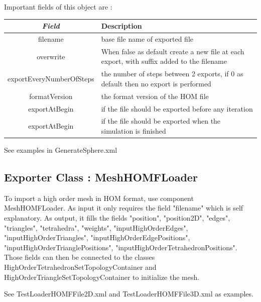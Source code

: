\documentclass[a4paper,11pt]{article}
\begin{document}
Important fields of this object are :
 \begin{center}
\begin{tabular}{|c|l|} \hline 		{\em Field} & Description \\ \hline 
	 filename & base file name of exported file  	 \\ \hline 
	overwrite & \tiny  When false as default create a new file at each export, with suffix added to the filename 	 \\ \hline
	exportEveryNumberOfSteps & \tiny  the number of steps between 2 exports, if 0 as default then no export is performed  \\ \hline
	formatVersion & the format version of the HOM file \\ \hline
		exportAtBegin & if the file should be exported before any iteration  \\ \hline
				exportAtBegin & if the file should be exported when the simulation is finished  \\ \hline
	\end{tabular} \end{center}
	
	See examples in GenerateSphere.xml 

\subsection{Exporter Class : MeshHOMFLoader}

To import a high order mesh in HOM format, use component MeshHOMFLoader. As input it only requires the field "filename" which is self explanatory. As output, it fills the fields "position", "position2D", "edges", "triangles", "tetrahedra", "weights", "inputHighOrderEdges", "inputHighOrderTriangles", 
"inputHighOrderEdgePositions", "inputHighOrderTrianglePositions", "inputHighOrderTetrahedronPositions". Those fields can then be connected to the classes HighOrderTetrahedronSetTopologyContainer and HighOrderTriangleSetTopologyContainer to initialize the mesh.

See TestLoaderHOMFFile2D.xml and TestLoaderHOMFFile3D.xml as examples.
\end{document}
